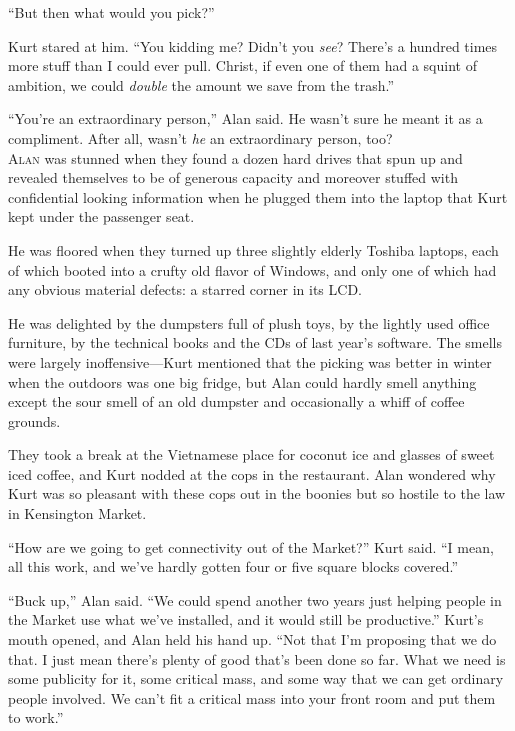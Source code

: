 ``But then what would you pick?''

Kurt stared at him.  ``You kidding me?  Didn't you \textit{see}? 
There's a hundred times more stuff than I could ever pull.  Christ, if
even one of them had a squint of ambition, we could \textit{double}
the amount we save from the trash.''

``You're an extraordinary person,'' Alan said.  He wasn't sure he
meant it as a compliment.  After all, wasn't \textit{he} an
extraordinary person, too?
\\
\lettrine[lines=3, lhang=.5, nindent=0pt, findent=2pt]{A}{lan} was stunned when they found a dozen hard drives that spun up and
revealed themselves to be of generous capacity and moreover stuffed
with confidential looking information when he plugged them into the
laptop that Kurt kept under the passenger seat.

He was floored when they turned up three slightly elderly Toshiba
laptops, each of which booted into a crufty old flavor of Windows, and
only one of which had any obvious material defects:  a starred corner
in its LCD.

He was delighted by the dumpsters full of plush toys, by the lightly
used office furniture, by the technical books and the CDs of last
year's software.  The smells were largely inoffensive---Kurt mentioned
that the picking was better in winter when the outdoors was one big
fridge, but Alan could hardly smell anything except the sour smell of
an old dumpster and occasionally a whiff of coffee grounds.

They took a break at the Vietnamese place for coconut ice and glasses
of sweet iced coffee, and Kurt nodded at the cops in the restaurant. 
Alan wondered why Kurt was so pleasant with these cops out in the
boonies but so hostile to the law in Kensington Market.

``How are we going to get connectivity out of the Market?'' Kurt said. 
``I mean, all this work, and we've hardly gotten four or five square
blocks covered.''

``Buck up,'' Alan said.  ``We could spend another two years just
helping people in the Market use what we've installed, and it would
still be productive.'' Kurt's mouth opened, and Alan held his hand up. 
``Not that I'm proposing that we do that.  I just mean there's plenty
of good that's been done so far.  What we need is some publicity for
it, some critical mass, and some way that we can get ordinary people
involved.  We can't fit a critical mass into your front room and put
them to work.''

